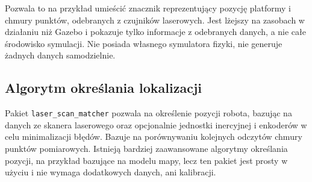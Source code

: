 		Pozwala to na przykład umieścić znacznik reprezentujący pozycję platformy i chmury punktów, odebranych z czujników laserowych.
		Jest lżejszy na zasobach w działaniu niż Gazebo i pokazuje tylko informacje z odebranych danych, a nie całe środowisko symulacji.
		Nie posiada własnego symulatora fizyki, nie generuje żadnych danych samodzielnie.
		
	\subsection{Algorytm określania lokalizacji}
		Pakiet \texttt{laser\_scan\_matcher} pozwala na określenie pozycji robota, bazując na danych ze skanera laserowego oraz opcjonalnie jednostki inercyjnej i enkoderów w
		celu minimalizacji błędów. Bazuje na porównywaniu kolejnych odczytów chmury punktów pomiarowych.
		Istnieją bardziej zaawansowane algorytmy określania pozycji, na przykład bazujące na modelu mapy, lecz ten pakiet jest prosty w użyciu i nie wymaga dodatkowych danych, ani kalibracji.
		
	
	
	
	
	

